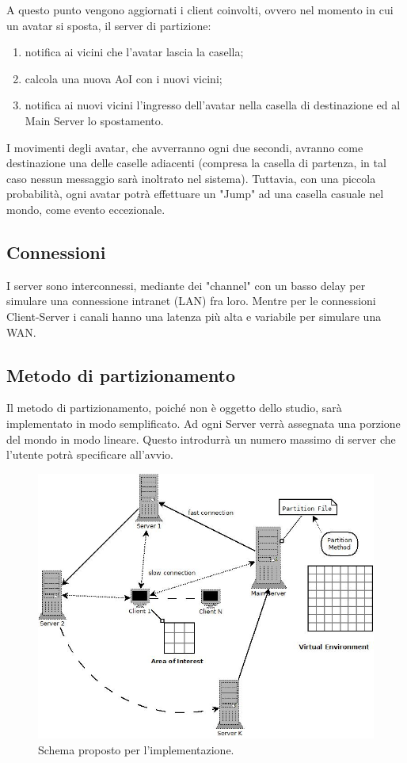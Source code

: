 \documentclass{article}
\begin{document}
A questo punto vengono aggiornati i client coinvolti, ovvero nel momento
in cui un avatar si sposta, il server di partizione:
\begin{enumerate}
\item
notifica ai vicini che l'avatar lascia la casella;
\item
calcola una nuova AoI con i nuovi vicini;
\item
notifica ai nuovi vicini l'ingresso dell'avatar nella casella di
destinazione ed al Main Server lo spostamento.
\end{enumerate}

I movimenti degli avatar, che avverranno ogni due secondi, avranno come
destinazione una delle caselle adiacenti (compresa la casella di partenza,
in tal caso nessun messaggio sarà inoltrato nel sistema). Tuttavia, con una
piccola probabilità, ogni avatar potrà effettuare un "Jump" ad una casella
casuale nel mondo, come evento eccezionale.

\subsection{Connessioni}
I server sono interconnessi, mediante dei "channel" con un basso delay
per simulare una connessione intranet (LAN) fra loro. Mentre per le connessioni
Client-Server i canali hanno una latenza più alta e variabile per 
simulare una WAN.

\subsection{Metodo di partizionamento}
Il metodo di partizionamento, poiché non è oggetto dello studio, sarà
implementato in modo semplificato. Ad ogni Server verrà assegnata una porzione
del mondo in modo lineare. Questo introdurrà un numero massimo di server che
l'utente potrà specificare all'avvio.

\begin{figure}
\begin{center}
\includegraphics[scale=0.50]{schemaRing.jpeg}
\end{center}
\caption{Schema proposto per l'implementazione.}
\label{fig2}
\end{figure}
\end{document}
